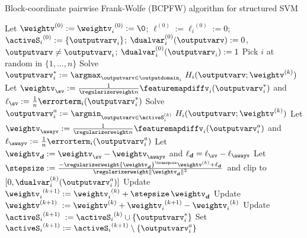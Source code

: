 \documentclass{article}
\begin{document}
\begin{algorithm}[t]
    \caption{Block-coordinate pairwise Frank-Wolfe (BCPFW) algorithm for structured SVM}%
    \label{alg:pFW_product_SVM_pairwise}
\begin{algorithmic}[1]
        \STATE Let $\weightv^{(0)}:= {\weightv_i}^{(0)}:= \0$; \; $\ell^{(0)}:={\ell_i}^{(0)}:=0$; \;  
        \STATE ${\activeS_i}^{(0)}:=\{\outputvarv_i\}$;
        \STATE $\dualvar_i^{(0)}(\outputvarv):=0$, $\outputvarv\neq \outputvarv_i$; \; $\dualvar_i^{(0)}(\outputvarv_i):=1$
                \STATE Pick $i$ at random in $\{1,\ldots,n\}$ 
                \STATE Solve $\outputvarv_i^* := \displaystyle\argmax_{\outputvarv\in\outputdomain_i} \ H_i(\outputvarv;\weightv^{(k)})$ %
                \STATE Let $\weightv_{\sv} := \frac1{\regularizerweight n} \featuremapdiffv_i(\outputvarv_i^*)$ \;
                and \; $\ell_{\sv} := \frac1n \errorterm_i(\outputvarv_i^*)$
                \STATE Solve $\outputvarv_i^a := \displaystyle\argmin_{\outputvarv\in\activeS_i^{(k)}} \ H_i(\outputvarv;\weightv^{(k)})$ 
                \STATE Let $\weightv_{\awayv} := \frac1{\regularizerweight n} \featuremapdiffv_i(\outputvarv_i^a)$ \;
                and  $\ell_{\awayv} := \frac1n \errorterm_i(\outputvarv_i^a)$  
                \STATE Let $\weightv_{\bm{d}} :=  \weightv_{\sv}-\weightv_{\awayv}$ \;
                 and \; $\ell_{\bm{d}}=\ell_{\sv}-\ell_{\awayv}$
%
%
%
%
%
               \STATE Let $\stepsize := \frac{-\regularizerweight {\weightv_{\bm{d}}}^\transpose \weightv^{(k)} + \ell_{\bm{d}}}{ \regularizerweight \|\weightv_{\bm{d}}\|^2}$~and clip to $[0,\dualvar_i^{(k)}(\outputvarv_i^a)]$
                \STATE Update ${\weightv_i}^{(k+1)}:= {\weightv_i}^{(k)}+\stepsize \,\weightv_{\bm{d}}$
                \STATE Update $\weightv^{(k+1)}\;:= \weightv^{(k)} + {\weightv_i}^{(k+1)} - {\weightv_i}^{(k)}$
                \STATE Update ${\activeS_i}^{(k+1)}\;:= {\activeS_i}^{(k)} \cup \{\outputvarv_i^* \}$ 
                 \STATE Set ${\activeS_i}^{(k+1)}:= {\activeS_i}^{(k+1)} \setminus \{\outputvarv_i^a \}$  
                \ENDIF
        \ENDFOR
\end{algorithmic}
\end{algorithm}
\end{document}
